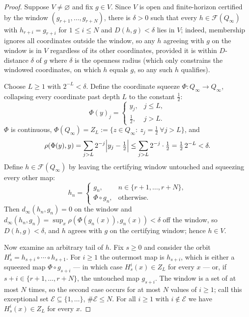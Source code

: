 \documentclass[11pt]{article}
\newcommand{\Q}{Q_\infty}
\newcommand{\F}{\mathcal{F}}
\begin{document}
\begin{proof}
Suppose $V\ne\varnothing$ and fix $g\in V$.  Since $V$ is open and finite-horizon
certified by the window $(g_{r+1},\dots,g_{r+N})$, there is $\delta>0$ such that every
$h\in\F(\Q)$ with $h_{r+i}=g_{r+i}$ for $1\le i\le N$ and $D(h,g)<\delta$ lies in $V$;
indeed, membership ignores all coordinates outside the window, so any $h$ agreeing with
$g$ on the window is in $V$ regardless of its other coordinates, provided it is within
$D$-distance $\delta$ of $g$ where $\delta$ is the openness radius (which only constrains
the windowed coordinates, on which $h$ equals $g$, so any such $h$ qualifies).

Choose $L\ge1$ with $2^{-L}<\delta$.  Define the coordinate squeeze $\Phi:\Q\to\Q$,
collapsing every coordinate past depth $L$ to the constant $\tfrac12$:
\[
\Phi(y)_j=
\begin{cases}
y_j, & j\le L,\\[2pt]
\tfrac12, & j>L.
\end{cases}
\]
$\Phi$ is continuous, $\Phi(\Q)=Z_L:=\{z\in\Q:\ z_j=\tfrac12\ \forall j>L\}$, and
\[
\rho(\Phi(y),y)=\sum_{j>L}2^{-j}\Bigl|y_j-\tfrac12\Bigr|
\le\sum_{j>L}2^{-j}\cdot\tfrac12=\tfrac12\,2^{-L}<\delta .
\]
Define $h\in\F(\Q)$ by leaving the certifying window untouched and squeezing every other
map:
\[
h_n=\begin{cases}
g_n, & n\in\{r+1,\dots,r+N\},\\
\Phi\circ g_n, & \text{otherwise.}
\end{cases}
\]
Then $d_\infty(h_n,g_n)=0$ on the window and
$d_\infty(h_n,g_n)=\sup_x\rho(\Phi(g_n(x)),g_n(x))<\delta$ off the window, so
$D(h,g)<\delta$, and $h$ agrees with $g$ on the certifying window; hence $h\in V$.

Now examine an arbitrary tail of $h$.  Fix $s\ge0$ and consider the orbit
$H^i_s=h_{s+i}\circ\cdots\circ h_{s+1}$.  For $i\ge1$ the outermost map is $h_{s+i}$,
which is either a squeezed map $\Phi\circ g_{s+i}$ --- in which case $H^i_s(x)\in Z_L$
for every $x$ --- or, if $s+i\in\{r+1,\dots,r+N\}$, the untouched map $g_{s+i}$.  The
window is a set of at most $N$ times, so the second case occurs for at most $N$ values of
$i\ge1$; call this exceptional set $\mathcal E\subseteq\{1,\dots\}$, $\#\mathcal E\le N$.
For all $i\ge1$ with $i\notin\mathcal E$ we have $H^i_s(x)\in Z_L$ for every $x$.


\end{proof}
\end{document}
